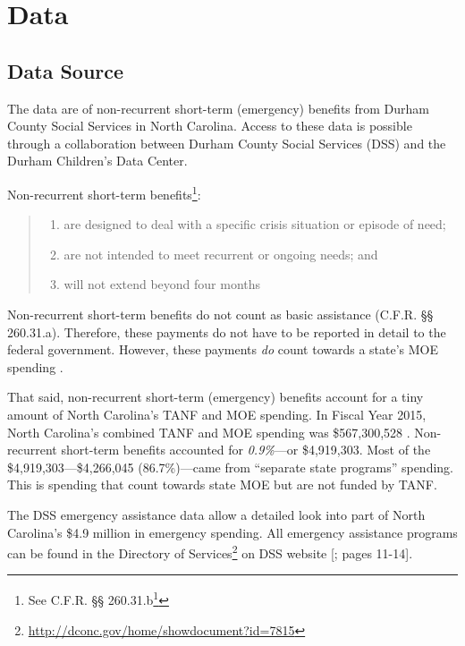 \documentclass[12pt,letterpaperpaper,]{book}
\providecommand{\tightlist}{%
  \setlength{\itemsep}{0pt}\setlength{\parskip}{0pt}}
\renewcommand{\href}[2]{#2\footnote{\url{#1}}}
\begin{document}
\section*{Data}\label{data-3}

\subsection*{Data Source}\label{data-source}

The data are of non-recurrent short-term (emergency) benefits from
Durham County Social Services in North Carolina. Access to these data is
possible through a collaboration between Durham County Social Services
(DSS) and the Durham Children's Data Center.

Non-recurrent short-term benefits\footnote{See
  \href{https://www.govregs.com/regulations/title45_chapterII_part260_subpartA_section260.31}{C.F.R.
  §§ 260.31.b}}:

\begin{quote}
\begin{enumerate}
\def\labelenumi{\arabic{enumi}.}
\tightlist
\item
  are designed to deal with a specific crisis situation or episode of
  need;\\
\item
  are not intended to meet recurrent or ongoing needs; and
\item
  will not extend beyond four months
\end{enumerate}
\end{quote}

Non-recurrent short-term benefits do not count as basic assistance
(C.F.R. §§ 260.31.a). Therefore, these payments do not have to be
reported in detail to the federal government. However, these payments
\emph{do} count towards a state's MOE spending \citep{schott_how_2015}.

That said, non-recurrent short-term (emergency) benefits account for a
tiny amount of North Carolina's TANF and MOE spending. In Fiscal Year
2015, North Carolina's combined TANF and MOE spending was \$567,300,528
\citep{us_dhhs_tanf_2015-1}. Non-recurrent short-term benefits accounted
for \emph{0.9\%}---or \$4,919,303. Most of the \$4,919,303---\$4,266,045
(86.7\%)---came from ``separate state programs'' spending. This is
spending that count towards state MOE but are not funded by TANF.

The DSS emergency assistance data allow a detailed look into part of
North Carolina's \$4.9 million in emergency spending. All emergency
assistance programs can be found in the
\href{http://dconc.gov/home/showdocument?id=7815}{Directory of Services}
on DSS website
{[}\citet{durham_county_department_of_social_services_directory_2016};
pages 11-14{]}.
\end{document}
